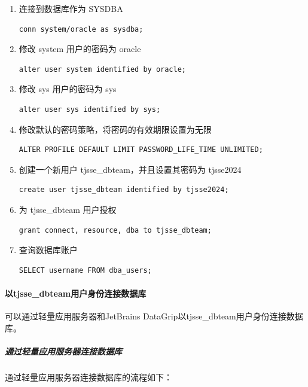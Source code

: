 \begin{enumerate}
    \item 连接到数据库作为 SYSDBA
          \begin{verbatim}
conn system/oracle as sysdba;
          \end{verbatim}
    \item 修改 system 用户的密码为 oracle
          \begin{verbatim}
alter user system identified by oracle;
          \end{verbatim}
    \item 修改 sys 用户的密码为 sys
          \begin{verbatim}
alter user sys identified by sys;
          \end{verbatim}
    \item 修改默认的密码策略，将密码的有效期限设置为无限
          \begin{verbatim}
ALTER PROFILE DEFAULT LIMIT PASSWORD_LIFE_TIME UNLIMITED;
          \end{verbatim}
    \item 创建一个新用户 tjsse\_dbteam，并且设置其密码为 tjsse2024
          \begin{verbatim}
create user tjsse_dbteam identified by tjsse2024;
          \end{verbatim}
    \item 为 tjsse\_dbteam 用户授权
          \begin{verbatim}
grant connect, resource, dba to tjsse_dbteam;
          \end{verbatim}
    \item 查询数据库账户
          \begin{verbatim}
SELECT username FROM dba_users;
          \end{verbatim}
\end{enumerate}

\paragraph{以tjsse\_dbteam用户身份连接数据库}

可以通过轻量应用服务器和JetBrains DataGrip以tjsse\_dbteam用户身份连接数据库。

\subparagraph{通过轻量应用服务器连接数据库}

通过轻量应用服务器连接数据库的流程如下：

